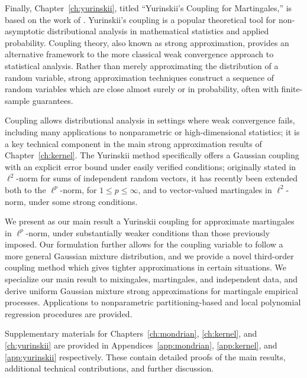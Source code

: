 Finally, Chapter~\ref{ch:yurinskii}, titled ``Yurinskii's Coupling for
Martingales,'' is based on the work of \cite{cattaneo2022yurinskii}.
Yurinskii's coupling is a popular theoretical tool for non-asymptotic
distributional analysis in mathematical statistics and applied probability.
Coupling theory, also known as strong approximation, provides an alternative
framework to the more classical weak convergence approach to statistical
analysis. Rather than merely approximating the distribution of a random
variable, strong approximation techniques construct a sequence of random
variables which are close almost surely or in probability, often with
finite-sample guarantees.

Coupling allows distributional analysis in settings where weak convergence
fails, including many applications to nonparametric or high-dimensional
statistics; it is a key technical component in the main strong approximation
results of Chapter~\ref{ch:kernel}. The Yurinskii method specifically offers a
Gaussian coupling with an explicit error bound under easily verified
conditions; originally stated in $\ell^2$-norm for sums of independent random
vectors, it has recently been extended both to the $\ell^p$-norm, for $1 \leq p
\leq \infty$, and to vector-valued martingales in $\ell^2$-norm, under some
strong conditions.

We present as our main result a Yurinskii coupling for approximate martingales
in $\ell^p$-norm, under substantially weaker conditions than those previously
imposed. Our formulation further allows for the coupling variable to follow a
more general Gaussian mixture distribution, and we provide a novel third-order
coupling method which gives tighter approximations in certain situations. We
specialize our main result to mixingales, martingales, and independent data,
and derive uniform Gaussian mixture strong approximations for martingale
empirical processes. Applications to nonparametric partitioning-based and local
polynomial regression procedures are provided.

Supplementary materials for Chapters~\ref{ch:mondrian}, \ref{ch:kernel}, and
\ref{ch:yurinskii} are provided in Appendices~\ref{app:mondrian},
\ref{app:kernel}, and \ref{app:yurinskii} respectively. These contain detailed
proofs of the main results, additional technical contributions, and further
discussion.
